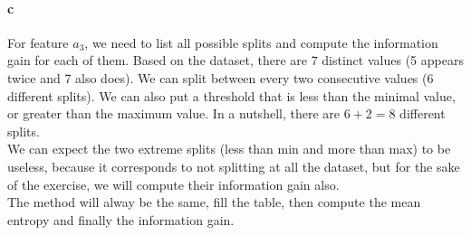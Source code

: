 \documentclass[a4paper, 10pt]{article}
\begin{document}
\paragraph{c}
For feature $a_3$, we need to list all possible splits and compute the information gain for each of them.
Based on the dataset, there are 7 distinct values (5 appears twice and 7 also does). We can split between every
two consecutive values (6 different splits). We can also put a threshold that is less than the minimal value, or greater than 
the maximum value. In a nutshell, there are $6+2=8$ different splits.
\\
We can expect the two extreme splits (less than min and more than max) to be useless, because it corresponds to not 
splitting at all the dataset, but for the sake of the exercise, we will compute their information gain also.
\\
The method will alway be the same, fill the table, then compute the mean entropy and finally the information gain.
\end{document}
